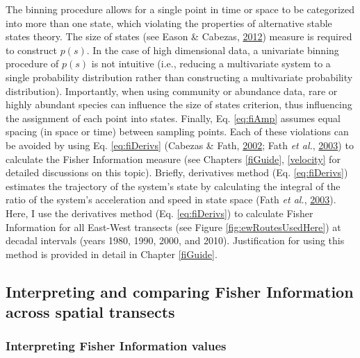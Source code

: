 \documentclass[12pt,twoside,openany]{reedthesis}
\begin{document}
The binning procedure allows for a single point in time or space to be categorized into more than one state, which violating the properties of alternative stable states theory. The size of states (see Eason \& Cabezas, \protect\hyperlink{ref-eason_evaluating_2012}{2012}) measure is required to construct \(p(s)\). In the case of high dimensional data, a univariate binning procedure of \(p(s)\) is not intuitive (i.e., reducing a multivariate system to a single probability distribution rather than constructing a multivariate probability distribution). Importantly, when using community or abundance data, rare or highly abundant species can influence the size of states criterion, thus influencing the assignment of each point into states. Finally, Eq. \eqref{eq:fiAmp} assumes equal spacing (in space or time) between sampling points. Each of these violations can be avoided by using Eq. \eqref{eq:fiDerivs} (Cabezas \& Fath, \protect\hyperlink{ref-cabezas_towards_2002}{2002}; Fath \emph{et al.}, \protect\hyperlink{ref-fath_regime_2003}{2003}) to calculate the Fisher Information measure (see Chapters \ref{fiGuide}, \ref{velocity} for detailed discussions on this topic). Briefly, derivatives method (Eq. \eqref{eq:fiDerivs}) estimates the trajectory of the system's state by calculating the integral of the ratio of the system's acceleration and speed in state space (Fath \emph{et al.}, \protect\hyperlink{ref-fath_regime_2003}{2003}). Here, I use the derivatives method (Eq. \eqref{eq:fiDerivs}) to calculate Fisher Information for all East-West transects (see Figure \ref{fig:ewRoutesUsedHere}) at decadal intervals (years 1980, 1990, 2000, and 2010). Justification for using this method is provided in detail in Chapter \ref{fiGuide}.

\hypertarget{interpreting-and-comparing-fisher-information-across-spatial-transects}{%
\subsection{Interpreting and comparing Fisher Information across spatial transects}\label{interpreting-and-comparing-fisher-information-across-spatial-transects}}

\hypertarget{interpreting-fisher-information-values}{%
\subsubsection{Interpreting Fisher Information values}\label{interpreting-fisher-information-values}}
\end{document}
